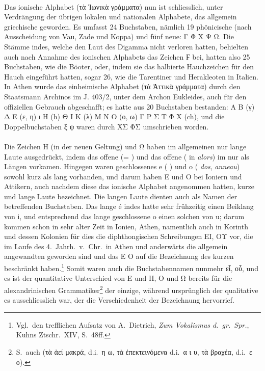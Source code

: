 \paragraph{\label{par:ionicalpha}}Das ionische Alphabet (τὰ Ἰωνικὰ γράμματα) nun ist schliesslich, unter Verdrängung der übrigen lokalen und nationalen Alphabete, das allgemein griechische geworden.
Es umfasst 24 Buchstaben, nämlich 19 phönicische (nach Ausscheidung von Vau, Zade und Koppa) und fünf neue: Γ Φ Χ Ψ Ω.
Die Stämme indes, welche den Laut des Digamma nicht verloren hatten, behielten
auch nach Annahme des ionischen Alphabets das Zeichen Ϝ bei, hatten also 25
Buchstaben, wie die Böoter, oder, indem sie das halbierte Hauchzeichen
 für den Hauch eingeführt hatten, sogar 26, wie die Tarentiner und Herakleoten in Italien.
In Athen wurde das einheimische Alphabet (τὰ Ἀττικὰ γράμματα) durch den
Staatsmann Archinos im J. 403/2, unter dem Archon Eukleides, auch für den
offiziellen Gebrauch abgeschafft; es hatte aus 20 Buchstaben bestanden: Α Β
 (γ) Δ Ε (ε, η) {\sffamily\textsc{i}} Η (h) Θ Ι Κ 
(λ) Μ Ν Ο (ο, ω) Γ Ρ Σ Τ Φ Χ (ch), und die Doppelbuchstaben ξ ψ waren durch ΧΣ
ΦΣ umschrieben worden.

\paragraph{\label{par:heta}}Die Zeichen Η (in der neuen Geltung) und Ω haben im
allgemeinen nur lange Laute ausgedrückt, indem das offene  (=
  ) und das offene  (  in
\emph{alors}) im  nur als Längen vorkamen.
Hingegen waren geschlossenes e ( ) und o
( \emph{dos}, \emph{anneau}) sowohl kurz als lang
vorhanden, und darum haben Ε und Ο bei Ioniern und Attikern, auch nachdem diese
das ionische Alphabet angenommen hatten, kurze und lange Laute bezeichnet.
Die langen Laute dienten auch als Namen der betreffenden Buchstaben.
Das lange é indes hatte sehr frühzeitig einen Beiklang von i, und entsprechend
das lange geschlossene o einen solchen von u; darum kommen schon in sehr alter
Zeit in Ionien, Athen, namentlich auch in Korinth und dessen Kolonien für dies
 die diphthongischen Schreibungen ΕΙ, ΟΥ vor, die im Laufe des
4.~Jahrh.~v.~Chr.~in Athen und anderwärts die allgemein angewandten geworden sind und das Ε Ο
auf die Bezeichnung des kurzen  beschränkt haben.\footnote{Vgl.\ den
	trefflichen Aufsatz von A.~Dietrich, \emph{Zum Vokalismus d.~gr.~Spr.}, Kuhns
	Ztschr.~XIV, S.\ 48ff.}
Somit waren auch die Buchstabennamen nunmehr εἶ, οὖ, und es ist der quantitative
Unterschied von Ε und Η, Ο und Ω bereits für die alexandrinischen
Grammatiker\footnote{S.\ auch  (τὰ ἀεί
	μακρά, d.i.~η ω, τὰ ἐπεκτεινόμενα d.i.~α ι υ, τὰ βραχέα, d.i.~ε ο).} der
einzige, während ursprünglich der qualitative es ausschliesslich war, der die
Verschiedenheit der Bezeichnung hervorrief.

